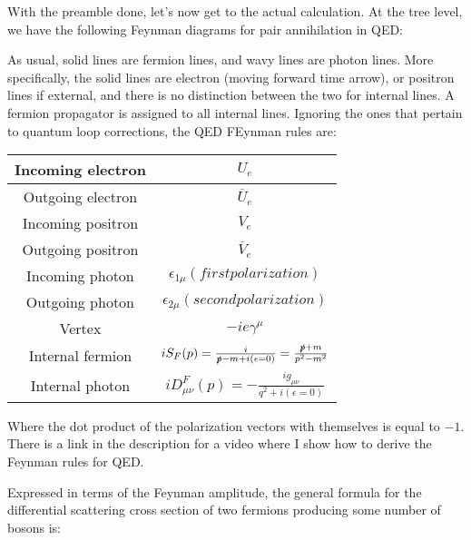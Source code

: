 \documentclass[a4]{article}
\begin{document}
    With the preamble done, let's now get to the actual calculation. At the tree level, we have the following Feynman diagrams for pair annihilation in QED:

    As usual, solid lines are fermion lines, and wavy lines are photon lines. More specifically, the solid lines are electron (moving forward time arrow), or positron lines if external, and there is no distinction
    between the two for internal lines. A fermion propagator is assigned to all internal lines. Ignoring the ones that pertain to quantum loop corrections, the QED FEynman rules are:

    \begin{center}
        \begin{tabular}[center]{|c|c|}
            \hline
            Incoming electron & $U_{e}$ \\
            \hline
            Outgoing electron & $\overline{U}_{e}$ \\
            \hline
            Incoming positron & $V_{e}$ \\
            \hline
            Outgoing positron & $\overline{V}_{e}$ \\
            \hline
            Incoming photon & $\epsilon_{1 \mu} (first polarization)$ \\
            \hline
            Outgoing photon & $\epsilon_{2 \mu} (second polarization)$ \\
            \hline
            Vertex & $-i e \gamma^{\mu}$ \\
            \hline
            Internal fermion & $i S_{F} (p) = \frac{i}{\slashed{p} - m + i (\epsilon = 0)} = \frac{\slashed{p} + m}{p^2 - m^2}$ \\
            \hline
            Internal photon & $i D^{F}_{\mu \nu} (p) = - \frac{i g_{\mu \nu}}{q^2 + i(\epsilon = 0)}$ \\
            \hline
        \end{tabular}
    \end{center}

    Where the dot product of the polarization vectors with themselves is equal to $-1$. There is a link in the description for a video where I show how to derive the Feynman rules for QED.

    Expressed in terms of the Feynman amplitude, the general formula for the differential scattering cross section of two fermions producing some number of bosons is:

    \begin{center}
    \end{center}
\end{document}
